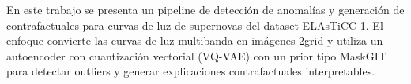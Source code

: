 \documentclass[
	spanish, %
	letterpaper, oneside
]{book}
\begin{document}
\templatePortrait

\templatePagecfg

\begin{abstractd}
	En este trabajo se presenta un pipeline de detección de anomalías y generación
	de contrafactuales para curvas de luz de supernovas del dataset ELAsTiCC-1.
	El enfoque convierte las curvas de luz multibanda en imágenes 2grid y utiliza
	un autoencoder con cuantización vectorial (VQ-VAE) con un prior tipo MaskGIT
	para detectar outliers y generar explicaciones contrafactuales interpretables.
\end{abstractd}

\begin{dedicatory}
\end{dedicatory}

\begin{acknowledgments}
\end{acknowledgments}

\templateIndex

\templateFinalcfg










%   

\end{document}
